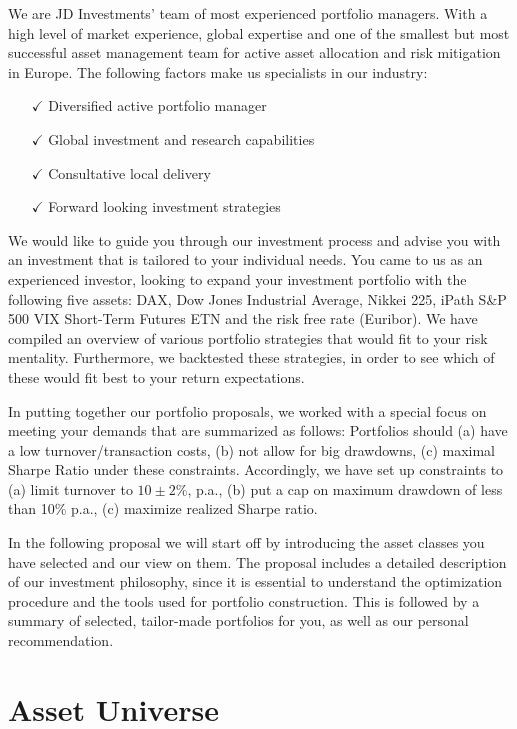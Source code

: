 \documentclass[11pt, parskip=full, DIV=14]{scrreprt}
\begin{document}
We are JD Investments’ team of most experienced portfolio managers.
With a high level of market experience, global expertise and one of the smallest but most successful asset management team for active asset allocation and risk mitigation in Europe.
The following factors make us specialists in our industry: 

\begin{itemize}
\item[$\checkmark$] Diversified active portfolio manager
\item[$\checkmark$] Global investment and research capabilities 
\item[$\checkmark$] Consultative local delivery 
\item[$\checkmark$] Forward looking investment strategies 
\end{itemize}

We would like to guide you through our investment process and advise you with an investment that is tailored to your individual needs.
You came to us as an experienced investor, looking to expand your investment portfolio with the following five assets: DAX, Dow Jones Industrial Average, Nikkei 225, iPath S\&P 500 VIX Short-Term Futures ETN and the risk free rate (Euribor).
We have compiled an overview of various portfolio strategies that would fit to your risk mentality.
Furthermore, we backtested these strategies, in order to see which of these would fit best to your return expectations.
  
In putting together our portfolio proposals, we worked with a special focus on meeting your demands that are summarized as follows:
Portfolios should (a) have a low turnover/transaction costs, (b) not allow for big drawdowns, (c) maximal Sharpe Ratio under these constraints.
Accordingly, we have set up constraints to (a) limit turnover to $10 \pm 2\%$, p.a., (b) put a cap on maximum drawdown of less than 10\% p.a., (c) maximize realized Sharpe ratio.

In the following proposal we will start off by introducing the asset classes you have selected and our view on them.
The proposal includes a detailed description of our investment philosophy, since it is essential to understand the optimization procedure and the tools used for portfolio construction.
This is followed by a summary of selected, tailor-made portfolios for you, as well as our personal recommendation.


\chapter{Asset Universe}
\end{document}
